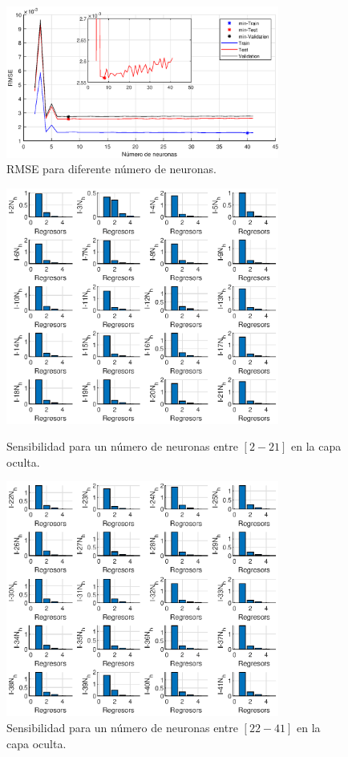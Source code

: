\documentclass[12pt]{article}
\begin{document}
\begin{itemize}
	\begin{figure}[h!]
		\centering
		 \includegraphics[width=0.8\textwidth]{imag/redes/RMSE_full.eps}
		\caption{RMSE para diferente número de neuronas.}
		\label{RMSE_full}
	\end{figure}
	\clearpage
	\begin{figure}[t!]
		\centering
		 \includegraphics[width=0.8\textwidth]{imag/redes/sensibilidad_full_1.eps}
		\caption{Sensibilidad para un número de neuronas entre $[2-21]$ en la capa oculta.}
		\label{sensi_red_1}
		 \includegraphics[width=0.8\textwidth]{imag/redes/sensibilidad_full_2.eps}
		\caption{Sensibilidad para un número de neuronas entre $[22-41]$ en la capa oculta.}
		\label{sensi_red_2}
	\end{figure}
	

\end{itemize}
\end{document}
